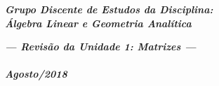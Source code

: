 \documentclass[pdftex, brazil, 12pt, oneside, addpoints, answers]{exam}
\begin{document}
\begin{coverpages}

\begin{center}
\textbf{\textit{\Large%
Grupo Discente de Estudos da Disciplina:\\
Álgebra Linear e Geometria Analítica}}
\end{center}

\vspace{1cm}

\begin{figure}[H]
\begin{center}
\end{center}
\end{figure}

\vspace{1cm}

\begin{center}
\textit{\textbf{\Large%
--- Revisão da Unidade 1: Matrizes ---\\
\ \\
Agosto/2018}}
\end{center}



\end{coverpages}
\end{document}
